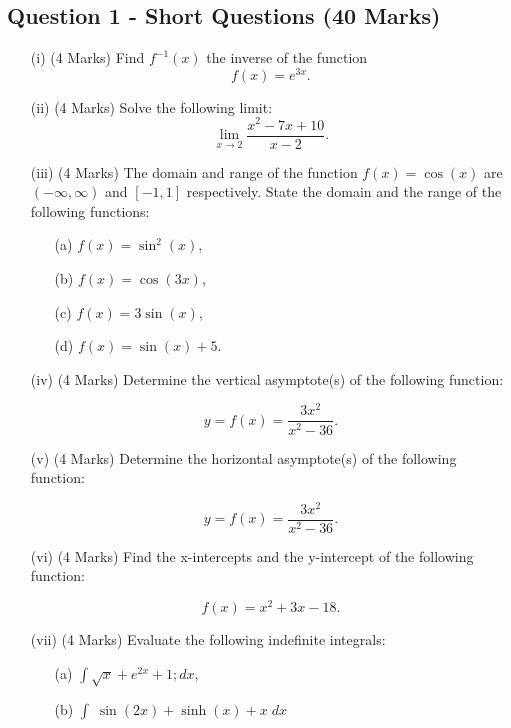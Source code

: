 \documentclass[a4paper,12pt]{article}
\begin{document}
\subsection*{Question 1 - Short Questions (40 Marks)}

\begin{itemize}
	
	\item[(i)](4 Marks) Find $f^{-1}(x)$ the inverse of the function
	\[f(x) = e^{3x}. \]
		\smallskip
	\item[(ii)](4 Marks)	Solve the following limit:
	\[\lim_{x \to 2 } \frac{x^2- 7x +10}{x-2}.\]
	\smallskip
	\item[(iii)] (4 Marks) The domain and range of the function $f(x) = \cos(x)$ are $(-\infty, \infty)$ and $[-1,1]$ respectively. State the domain and the range of the following functions:
	\begin{multicols}{2}
		\begin{itemize}
		
		
	\item[(a)] $f(x) = \sin^2(x)  $,
		\item[(b)] $f(x) = \cos(3x)  $,
	\item[(c)] $f(x) = 3\sin(x)  $,
		\item[(d)] $f(x) = \sin(x) + 5$.
	\end{itemize}
	\end{multicols}
	\smallskip
	\item[(iv)] (4 Marks) Determine the vertical asymptote(s) of the following function:
	
	
	\[ y = f(x) = \frac{3x^2}{x^2-36}. \]	
	\smallskip
		\item[(v)] (4 Marks) Determine the horizontal asymptote(s) of the following function:
		
	\[ y = f(x) = \frac{3x^2}{x^2-36}. \]
		
		\smallskip
	\item[(vi)] (4 Marks) Find the x-intercepts and the y-intercept of the following function:
	
	\[ f(x) = x^2 + 3x - 18 . \]
	
	\smallskip


	\newpage
	\item[(vii)] (4 Marks) Evaluate the following indefinite integrals:
	\begin{multicols}{2}
	\begin{itemize}
		\item[(a)] $\displaystyle{ \int \sqrt{x} + e^{2x} + 1; dx, }  $
		\item[(b)] $\displaystyle{ \int \;\sin(2x)+ \sinh(x) + x \; dx}$
		

\end{itemize}
\end{multicols}
\end{itemize}
\end{document}
